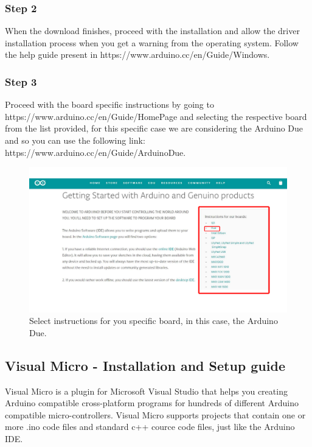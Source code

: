 \begin{refsection}
	
	\subsubsection{Step 2}
	
	When the download finishes, proceed with the installation and allow the driver installation process when you get a warning from the operating system. Follow the help guide present in https://www.arduino.cc/en/Guide/Windows.
	
	\subsubsection{Step 3}
	
	Proceed with the board specific instructions by going to https://www.arduino.cc/en/Guide/HomePage and selecting the respective board from the list provided, for this specific case we are considering the Arduino Due and so you can use the following link: https://www.arduino.cc/en/Guide/ArduinoDue.
	
	\begin{figure}[H]
		\centering
		\includegraphics[width=1\linewidth]{./sdf/arduino_quantum_rx/figures/arduinoBoards.pdf}
		\caption{Select instructions for you specific board, in this case, the Arduino Due.}
		\label{arduinoDownload}
	\end{figure}
	
	\subsection{Visual Micro - Installation and Setup guide}
	Visual Micro is a plugin for Microsoft Visual Studio that helps you creating Arduino compatible cross-platform programs for hundreds of different Arduino compatible micro-controllers. Visual Micro supports projects that contain one or more .ino code files and standard c++ cource code files, just like the Arduino IDE.
	

\end{refsection}
